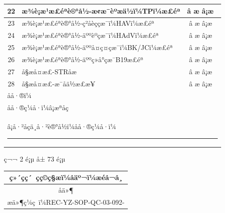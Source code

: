 \documentclass[UTF8,10pt,a4paper,fontset=fandol]{ctexart}
\newcommand{\fieldvalue}[1]{#1}
\newcommand{\handwritten}[1]{#1}
\begin{document}
\begin{center}
\begin{tabularx}{\textwidth}{|c|X|c|}
\hline
22 & æ¾è¡æ¹æ£éªè®°å½-æ¢æ¯èºæä½ï¼TPï¼æ£éª &
\fieldvalue{\handwritten{â æ}} \quad â¡æ  \\
\hline
23 & æ¾è¡æ¹æ£éªè®°å½-ç²åèççæ¯ï¼HAVï¼æ£éª &
\fieldvalue{\handwritten{â æ}} \quad â¡æ  \\
\hline
24 & æ¾è¡æ¹æ£éªè®°å½-äººèºçæ¯ï¼HAdVï¼æ£éª &
\fieldvalue{\handwritten{â æ}} \quad â¡æ  \\
\hline
25 & æ¾è¡æ¹æ£éªè®°å½-äººå¤ç¤çæ¯ï¼BK/JCï¼æ£éª &
\fieldvalue{\handwritten{â æ}} \quad â¡æ  \\
\hline
26 & æ¾è¡æ¹æ£éªè®°å½-äººç»å°çæ¯B19æ£éª &
\fieldvalue{\handwritten{â æ}} \quad â¡æ  \\
\hline
27 & å§æå¤æ£-STRåæ &
\fieldvalue{\handwritten{â æ}} \quad â¡æ  \\
\hline
28 & å§æå¤æ£-æ¯åä½æ£æ¥ &
\fieldvalue{\handwritten{â æ}} \quad â¡æ  \\
\hline
\multicolumn{3}{|l|}{åå·®ï¼} \\
\multicolumn{3}{|l|}{åå·®ç¼å·ï¼â¡æªåç} \\
\multicolumn{3}{|l|}{â¡å·²åçä¸å·²è®°å½ï¼åå·®ç¼å·ï¼\rule{5cm}{0.4pt}} \\
\hline
\end{tabularx}
\end{center}

\begin{center}
ç¬¬ 2 é¡µ å± 73 é¡µ
\end{center}

\newpage

\begin{center}
\begin{tabularx}{\textwidth}{|p{}|X|}
\hline
\multicolumn{2}{|c|}{ç»´çç´ çç©ç§æï¼åäº¬ï¼æéå¬å¸}\\
\hline
\multicolumn{2}{|c|}{åä»¶}\\
\hline
\multicolumn{2}{|c|}{æä»¶ç¼ç ï¼REC-YZ-SOP-QC-03-092-{}}
\\
\hline
\end{tabularx}
\end{center}
\end{document}
